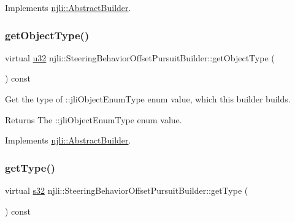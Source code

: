 Implements \mbox{\hyperlink{classnjli_1_1_abstract_builder_a902f73ea78031b06aca183a417f3413b}{njli\+::\+Abstract\+Builder}}.

\mbox{\label{classnjli_1_1_steering_behavior_offset_pursuit_builder_a3cd3001a77bb55273675797565071b04}} 
\subsubsection{\texorpdfstring{get\+Object\+Type()}{getObjectType()}}
{\footnotesize\ttfamily virtual \mbox{\hyperlink{_util_8h_a10e94b422ef0c20dcdec20d31a1f5049}{u32}} njli\+::\+Steering\+Behavior\+Offset\+Pursuit\+Builder\+::get\+Object\+Type (\begin{DoxyParamCaption}{ }\end{DoxyParamCaption}) const\hspace{0.3cm}{\ttfamily [virtual]}}

Get the type of \+::jli\+Object\+Enum\+Type enum value, which this builder builds.

\begin{DoxyReturn}{Returns}
The \+::jli\+Object\+Enum\+Type enum value. 
\end{DoxyReturn}


Implements \mbox{\hyperlink{classnjli_1_1_abstract_builder_a0f2d344fcf697b167f4f2b1122b5fb33}{njli\+::\+Abstract\+Builder}}.

\mbox{\label{classnjli_1_1_steering_behavior_offset_pursuit_builder_afebe863fcc6d4ea34b66d03a149eb51c}} 
\subsubsection{\texorpdfstring{get\+Type()}{getType()}}
{\footnotesize\ttfamily virtual \mbox{\hyperlink{_util_8h_aa62c75d314a0d1f37f79c4b73b2292e2}{s32}} njli\+::\+Steering\+Behavior\+Offset\+Pursuit\+Builder\+::get\+Type (\begin{DoxyParamCaption}{ }\end{DoxyParamCaption}) const\hspace{0.3cm}{\ttfamily [virtual]}}

